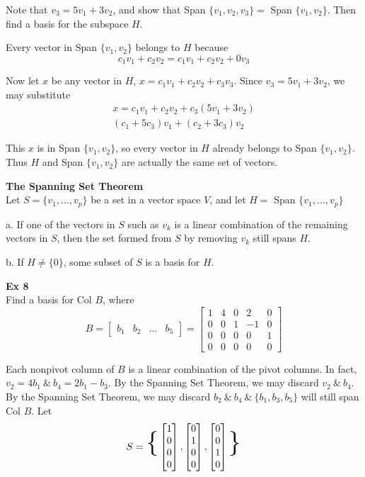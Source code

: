\documentclass{article}
\begin{document}
  Note that $ v_3=5v_1+3v_2 $, and show that Span $ \{ v_1,v_2,v_3 \} = $ Span $ \{ v_1,v_2 \} $. Then find a basis for the subspace $ H $.

  Every vector in Span $ \{ v_1,v_2 \} $ belongs to $ H $ because
  \[
    c_1v_1+c_2v_2=c_1v_1+c_2v_2+0v_3
  \]
  
  Now let $ x $ be any vector in $ H $, $ x=c_1v_1+c_2v_2+c_3v_3 $. Since $ v_3=5v_1+3v_2 $, we may substitute
  \[
    \begin{gathered}
    x=c_1v_1+c_2v_2+c_3(5v_1+3v_2)\\
    (c_1+5c_3)v_1 + (c_2+3c_3)v_2
    \end{gathered}
  \]

  This $ x $ is in Span $ \{ v_1,v_2 \} $, so every vector in $ H $ already belongs to Span $ \{ v_1,v_2 \} $. Thus $ H $ and Span $ \{ v_1,v_2 \} $ are actually the same set of vectors.

  \textbf{The Spanning Set Theorem}\\
  Let $ S=\{ v_1,...,v_p \} $ be a set in a vector space $ V $, and let $ H = $ Span $ \{ v_1,...,v_p \} $

  a. If one of the vectors in $ S $ such as $ v_k $ is a linear combination of the remaining vectors in $ S $, then the set formed from $ S $ by removing $ v_k $ still spans $ H $.

  b. If $ H \neq \{ 0 \} $, some subset of $ S $ is a basis for $ H $. 

  \textbf{Ex 8}\\
  Find a basis for Col $ B $, where
  \[
    B = \begin{bmatrix}
      b_1 &b_2 &... &b_5
    \end{bmatrix} = 
    \begin{bmatrix}
      1 &4 &0 &2 &0\\
      0 &0 &1 &-1 &0\\
      0 &0 &0 &0 &1\\
      0 &0 &0 &0 &0
    \end{bmatrix}
  \]
  
  Each nonpivot column of $ B $ is a linear combination of the pivot columns. In fact, $ v_2=4b_1 ~\&~ b_4=2b_1-b_3 $. By the Spanning Set Theorem, we may discard $ v_2 ~\&~ b_4 $. By the Spanning Set Theorem, we may discard $ b_2 ~\&~ b_4 ~\&~ \{ b_1,b_3,b_5 \} $ will still span Col $ B $. Let
  \[
    S = \text{\Huge{\{}}
      \begin{bmatrix}
        1\\
        0\\
        0\\
        0
      \end{bmatrix},
      \begin{bmatrix}
        0\\
        1\\
        0\\
        0
      \end{bmatrix},
      \begin{bmatrix}
        0\\
        0\\
        1\\
        0
      \end{bmatrix}
    \text{\Huge{\}}}
  \]
\end{document}
